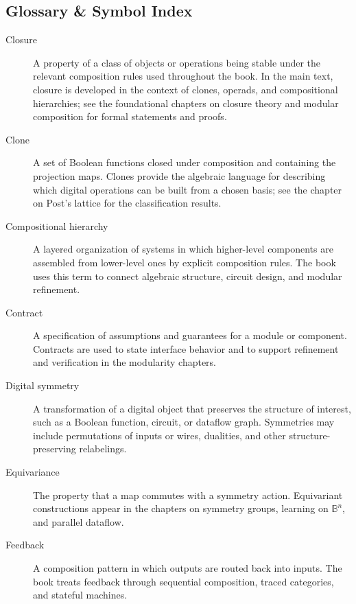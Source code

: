 \documentclass[11pt]{article}
\begin{document}

\subsection{Glossary \& Symbol Index}


\begin{description}
  \item[Closure] A property of a class of objects or operations being stable under the relevant composition rules used throughout the book. In the main text, closure is developed in the context of clones, operads, and compositional hierarchies; see the foundational chapters on closure theory and modular composition for formal statements and proofs.

  \item[Clone] A set of Boolean functions closed under composition and containing the projection maps. Clones provide the algebraic language for describing which digital operations can be built from a chosen basis; see the chapter on Post's lattice for the classification results.

  \item[Compositional hierarchy] A layered organization of systems in which higher-level components are assembled from lower-level ones by explicit composition rules. The book uses this term to connect algebraic structure, circuit design, and modular refinement.

  \item[Contract] A specification of assumptions and guarantees for a module or component. Contracts are used to state interface behavior and to support refinement and verification in the modularity chapters.

  \item[Digital symmetry] A transformation of a digital object that preserves the structure of interest, such as a Boolean function, circuit, or dataflow graph. Symmetries may include permutations of inputs or wires, dualities, and other structure-preserving relabelings.

  \item[Equivariance] The property that a map commutes with a symmetry action. Equivariant constructions appear in the chapters on symmetry groups, learning on \(\mathbb{B}^n\), and parallel dataflow.

  \item[Feedback] A composition pattern in which outputs are routed back into inputs. The book treats feedback through sequential composition, traced categories, and stateful machines.


\end{description}
\end{document}
